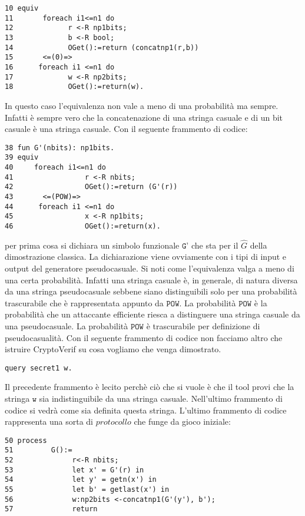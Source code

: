 \documentclass[a4paper,openright,twoside,12pt]{report}
\begin{document}
\begin{verbatim}
10 equiv
11       foreach i1<=n1 do
12             r <-R np1bits;
13             b <-R bool;
14             OGet():=return (concatnp1(r,b))
15       <=(0)=>
16      foreach i1 <=n1 do
17             w <-R np2bits;
18             OGet():=return(w).
\end{verbatim} 
In questo caso l'equivalenza non vale a meno di una probabilit\`a ma sempre. Infatti \`e sempre vero che la concatenazione di una stringa casuale e di un bit casuale \`e una stringa casuale.
Con il seguente frammento di codice:
\begin{verbatim}
38 fun G'(nbits): np1bits.
39 equiv
40     foreach i1<=n1 do
41                 r <-R nbits;
42                 OGet():=return (G'(r))
43       <=(POW)=> 
44      foreach i1 <=n1 do
45                 x <-R np1bits;
46                 OGet():=return(x).
\end{verbatim}
per prima cosa si dichiara un simbolo funzionale $\texttt{G'}$ che sta per il $\hat{G}$ della dimostrazione classica. La dichiarazione viene ovviamente con i tipi di input e output del generatore pseudocasuale.
Si noti come l'equivalenza valga a meno di una certa probabilit\`a. Infatti una stringa casuale \`e, in generale, di natura diversa da una stringa pseudocasuale sebbene siano distinguibili solo per una probabilit\`a trascurabile
che \`e rappresentata appunto da $\texttt{POW}$. La probabilit\`a $\texttt{POW}$ \`e la probabilit\`a che un attaccante efficiente riesca a distinguere una stringa casuale da una pseudocasuale. La probabilit\`a $\texttt{POW}$  \`e
trascurabile per definizione di pseudocasualit\`a.
Con il seguente frammento di codice non facciamo altro che istruire CryptoVerif su cosa vogliamo che venga dimostrato.
\begin{verbatim}
query secret1 w.
\end{verbatim}
Il precedente frammento \`e lecito perch\`e ci\`o che si vuole \`e che il tool provi che la stringa $\texttt{w}$ sia indistinguibile da una stringa casuale. Nell'ultimo frammento di codice si vedr\`a come sia definita questa stringa.
L'ultimo frammento di codice rappresenta una sorta di $protocollo$ che funge da gioco iniziale:
\begin{verbatim}
50 process
51         G():=
52              r<-R nbits;
53              let x' = G'(r) in
54              let y' = getn(x') in
55              let b' = getlast(x') in
56              w:np2bits <-concatnp1(G'(y'), b');
57              return
\end{verbatim}
\end{document}
